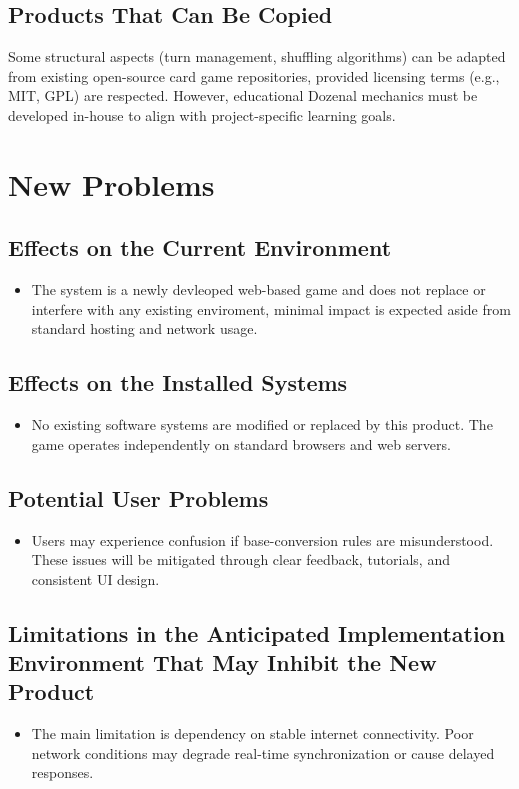 \documentclass[12pt]{article}
\begin{document}
\subsection{Products That Can Be Copied}
Some structural aspects (turn management, shuffling algorithms) can be adapted from existing open-source card game repositories, provided licensing terms (e.g., MIT, GPL) are respected.
However, educational Dozenal mechanics must be developed in-house to align with project-specific learning goals.


\section{New Problems}
\subsection{Effects on the Current Environment}
\begin{itemize}
	\item The system is a newly devleoped web-based game and does not replace or interfere with any existing enviroment, minimal impact is expected aside from standard hosting and network usage.
\end{itemize}
\subsection{Effects on the Installed Systems}
\begin{itemize}
	\item No existing software systems are modified or replaced by this product. The game operates independently on standard browsers and web servers.
\end{itemize}
\subsection{Potential User Problems}
\begin{itemize}
	\item Users may experience confusion if base-conversion rules are misunderstood. These issues will be mitigated through clear feedback, tutorials, and consistent UI design.
\end{itemize}
\subsection{Limitations in the Anticipated Implementation Environment That May
Inhibit the New Product}
\begin{itemize}
	\item The main limitation is dependency on stable internet connectivity. Poor network conditions may degrade real-time synchronization or cause delayed responses.
\end{itemize}
\end{document}
